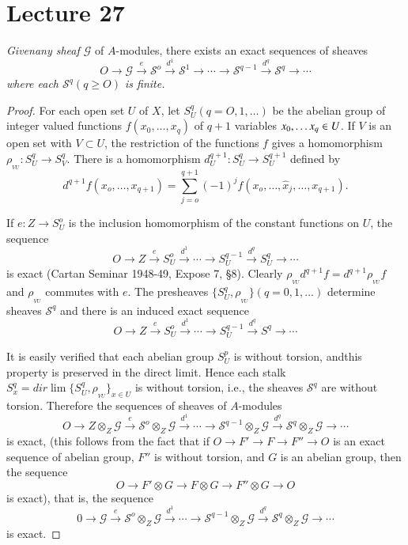 \chapter{Lecture 27}

\textit{Given\pageoriginale any sheaf $\mathscr{G}$} of $A$-modules,
there exists an exact sequences of sheaves  
$$
O \to \mathscr{G}\xrightarrow{e} \mathscr{S}^o \xrightarrow{d^1}
\mathscr{S}^1 \to \cdots \to \mathscr{S}^{q-1} \xrightarrow{d^q}
\mathscr{S}^q \to \cdots 
$$
\textit{where each $\mathscr{S}^q (q \geq O)$ is finite.}

\begin{proof}
For each open set $U$ of $X$, let $S^q_U(q=O,1, \ldots)$ be the
abelian group of integer valued functions $f(x_0, \ldots ,x_q)$ of
$q+1$ variables $x_0, \ldots\break x_q \in U$. If $V$ is an open set with $V
\subset U$, the restriction of the functions $f$ gives a homomorphism
$\rho_{_{VU}} : S^q_U \to S^q_V$. There is a homomorphism
$d^{q+1}_{U}:S^q_U \to S^{q+1}_U$ defined by 
$$
d^{q+1}f(x_o, \ldots ,x_{q+1})= \sum ^{q+1}_{j=o}(-1)^j f(x_o, \ldots,
\hat{x}_j,\ldots,x_{q+1}). 
$$

If $e:Z \to S^o_U$ is the inclusion homomorphism of the constant
functions on $U$, the sequence 
$$
O \to Z \xrightarrow{e}  S^o_U \xrightarrow{d^1} \cdots \to S^{q-1}_U
\xrightarrow{d^q}  S^q_U \to \cdots 
$$
is exact (Cartan Seminar 1948-49, Expose 7, \S 8). Clearly
$\rho_{_{VU}}d^{q+1} f=d^{q+1} \rho_{_{VU}}f$ and $\rho_{_{VU}}$ commutes
with $e$. The presheaves $\{ S^q_U, \rho_{_{VU}} \} (q = 0, 1, \ldots)$
determine sheaves $\mathscr{S}^q$ and there is an induced exact
sequence 
$$
O \to Z \xrightarrow{e}  S^o_U \xrightarrow{d^1} \cdots \to S^{q-1}_U 
\xrightarrow{d^q} S^q \to \cdots 
$$

It is easily verified that each abelian group $S^p_U$ is without
torsion, and\pageoriginale this property is preserved in the direct
limit. Hence 
each stalk $S^q_x=dir \lim \{ S^q_U, \rho_{_{VU}} \}_{x \in U}$ is
without torsion, i.e., the sheaves $\mathscr{S}^q$ are without
torsion. Therefore the sequences of sheaves of $A$-modules 
$$
O \to Z \otimes_Z \mathscr{G}\xrightarrow{e} \mathscr{S}^o \otimes_Z
\mathscr{G} \xrightarrow{d^1} \cdots \to \mathscr{S}^{q-1} \otimes_Z \mathscr{G}
\xrightarrow{d^q} \mathscr{S}^q  \otimes_Z \mathscr{G} \to \cdots 
$$
is exact, (this follows from the fact that if $O \to F' \to F \to F''
\to O$ is an exact sequence of abelian group, $F''$ is without
torsion, and $G$ is an abelian group, then the sequence 
$$
O \to F' \otimes G \to F \otimes G \to F'' \otimes G \to O  
$$
is exact), that is, the sequence
\begin{equation*}
0 \to \mathscr{G}\xrightarrow{e} \mathscr{S}^o
  \otimes_Z \mathscr{G} \xrightarrow{d^1} \cdots \to \mathscr{S}^{q-1}
  \otimes_Z \mathscr{G} \xrightarrow{d^q}  \mathscr{S}^q \otimes_Z
  \mathscr{G} \to \cdots\tag{1}\label{chap27:eq1}
\end{equation*}
is exact.


\end{proof}
